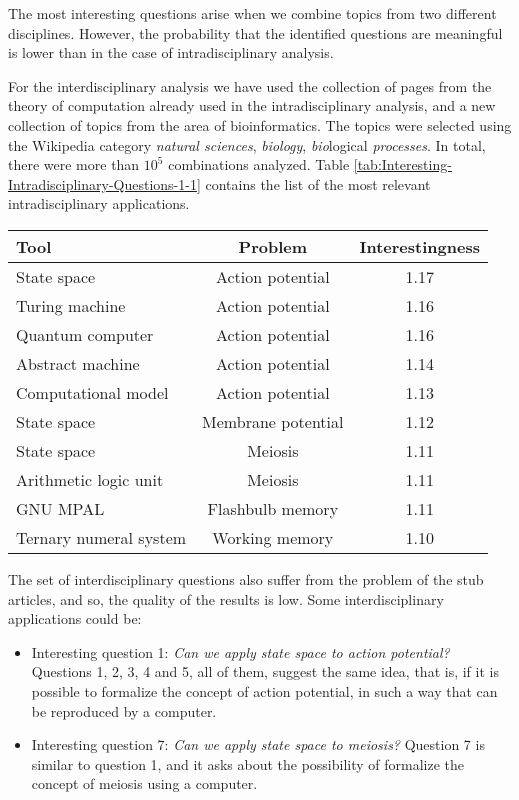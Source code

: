 The most interesting questions arise when we combine topics from two
different disciplines. However, the probability that the identified
questions are meaningful is lower than in the case of intradisciplinary
analysis.

For the interdisciplinary analysis we have used the collection of
pages from the theory of computation already used in the intradisciplinary
analysis, and a new collection of topics from the area of\emph{ }bioinformatics.
The topics were selected using the Wikipedia category \emph{natural
sciences}, \emph{biology}, \emph{bio}logical\emph{ processes}. In
total, there were more than $10^{5}$ combinations analyzed. Table
\ref{tab:Interesting-Intradisciplinary-Questions-1-1} contains the
list of the most relevant intradisciplinary applications.

\begin{table*}
\begin{centering}
\begin{tabular}{|l|c|c|}
\hline 
{Tool} & Problem & Interestingness\tabularnewline
\hline 
\hline 
State space & Action potential & 1.17\tabularnewline
\hline 
{Turing machine} & Action potential & 1.16\tabularnewline
\hline 
Quantum computer & Action potential & 1.16\tabularnewline
\hline 
Abstract machine & Action potential & 1.14\tabularnewline
\hline 
Computational model & Action potential & 1.13\tabularnewline
\hline 
State space & Membrane potential & 1.12\tabularnewline
\hline 
State space & Meiosis & 1.11\tabularnewline
\hline 
Arithmetic logic unit & Meiosis & 1.11\tabularnewline
\hline 
GNU MPAL & Flashbulb memory & 1.11\tabularnewline
\hline 
Ternary numeral system & Working memory & 1.10\tabularnewline
\hline 
\end{tabular}
\par\end{centering}

\caption{\label{tab:Interesting-Intradisciplinary-Questions-1-1}Interesting
Interdisciplinary Questions}
\end{table*}

The set of interdisciplinary questions also suffer from the problem
of the stub articles, and so, the quality of the results is low. Some
interdisciplinary applications could be:
\begin{itemize}
\item Interesting question 1: \emph{Can we apply state space to action potential?}
Questions 1, 2, 3, 4 and 5, all of them, suggest the same idea, that
is, if it is possible to formalize the concept of action potential,
in such a way that can be reproduced by a computer.
\item Interesting question 7: \emph{Can we apply state space to meiosis?}
Question 7 is similar to question 1, and it asks about the possibility
of formalize the concept of meiosis using a computer.
\end{itemize}


